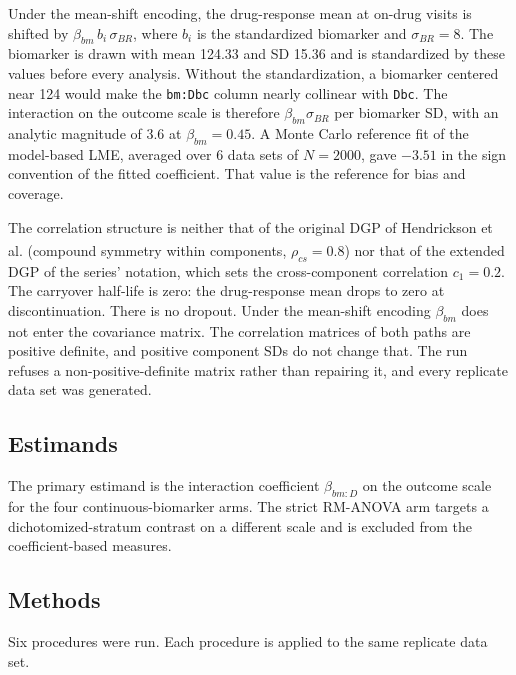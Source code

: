 \documentclass[
  11pt,
]{article}
\begin{document}
Under the mean-shift encoding, the drug-response mean at on-drug
visits is shifted by \(\beta_{bm}\, b_i\, \sigma_{BR}\), where \(b_i\) is
the standardized biomarker and \(\sigma_{BR} = 8\). The
biomarker is drawn with mean 124.33 and SD 15.36
and is standardized by these values before every analysis. Without
the standardization, a biomarker centered near 124 would make the
\texttt{bm:Dbc} column nearly collinear with \texttt{Dbc}. The interaction on the
outcome scale is therefore \(\beta_{bm} \sigma_{BR}\) per biomarker
SD, with an analytic magnitude of 3.6 at
\(\beta_{bm} = 0.45\). A Monte Carlo reference fit of the model-based
LME, averaged over 6 data sets of \(N = 2000\),
gave \(-3.51\) in the sign convention of the fitted
coefficient. That value is the reference for bias and coverage.

The correlation structure is neither that of the original DGP of
Hendrickson et al.\textsuperscript{} (compound symmetry within components,
\(\rho_{cs} = 0.8\)) nor that of the extended DGP of the series'
notation, which sets the cross-component correlation \(c_1 = 0.2\).
The carryover half-life is zero: the drug-response mean drops to
zero at discontinuation. There is no dropout. Under the mean-shift
encoding \(\beta_{bm}\) does not enter the covariance matrix. The
correlation matrices of both paths are positive definite, and
positive component SDs do not change that. The run refuses a
non-positive-definite matrix rather than repairing it, and every
replicate data set was generated.

\subsection{Estimands}\label{estimands}

The primary estimand is the interaction coefficient \(\beta_{bm:D}\)
on the outcome scale for the four continuous-biomarker arms. The
strict RM-ANOVA arm targets a dichotomized-stratum contrast on a
different scale and is excluded from the coefficient-based measures.

\subsection{Methods}\label{sec-methods}

Six procedures were run. Each procedure is applied to the same
replicate data set.
\end{document}
